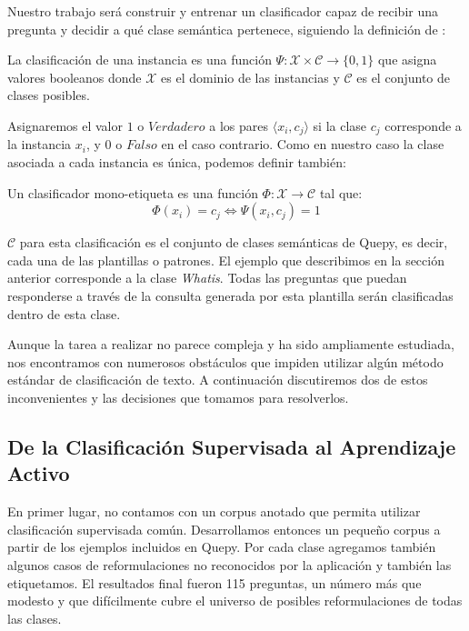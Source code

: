 Nuestro trabajo será construir y entrenar un clasificador capaz de recibir una pregunta y decidir a qué clase semántica pertenece, siguiendo la definición de \citet{Sebastiani-text-categorization}:

\begin{definition}
La clasificación de una instancia es una función $\Psi:\mathcal{X} \times \mathcal{C} \rightarrow \{0, 1\}$ que asigna valores booleanos donde $\mathcal{X}$ es el dominio de las instancias y $\mathcal{C}$ es el conjunto de clases posibles.
\end{definition}

Asignaremos el valor $1$ o $Verdadero$ a los pares $\langle x_i, c_j \rangle$ si la clase $c_j$ corresponde a la instancia $x_i$, y $0$ o $Falso$ en el caso contrario. Como en nuestro caso la clase asociada a cada instancia es única, podemos definir también:

\begin{definition}\label{def-clasificacion}
Un clasificador mono-etiqueta es una función $\Phi:\mathcal{X} \rightarrow \mathcal{C}$ tal que:
$$ \Phi(x_i) = c_j \Leftrightarrow \Psi(x_i, c_j) = 1 $$
\end{definition}

$\mathcal{C}$ para esta clasificación es el conjunto de clases semánticas de Quepy, es decir, cada una de las plantillas o patrones. El ejemplo que describimos en la sección anterior corresponde a la clase \textit{Whatis}. Todas las preguntas que puedan responderse a través de la consulta generada por esta plantilla serán clasificadas dentro de esta clase.




Aunque la tarea a realizar no parece compleja y ha sido ampliamente estudiada, nos encontramos con numerosos obstáculos que impiden utilizar algún método estándar de clasificación de texto. A continuación discutiremos dos de estos inconvenientes y las decisiones que tomamos para resolverlos.

\subsection{De la Clasificación Supervisada al Aprendizaje Activo}

En primer lugar, no contamos con un corpus anotado que permita utilizar clasificación supervisada común. Desarrollamos entonces un pequeño corpus a partir de los ejemplos incluidos en Quepy. Por cada clase agregamos también algunos casos de reformulaciones no reconocidos por la aplicación y también las etiquetamos. El resultados final fueron 115 preguntas, un número más que modesto y que difícilmente cubre el universo de posibles reformulaciones de todas las clases.

